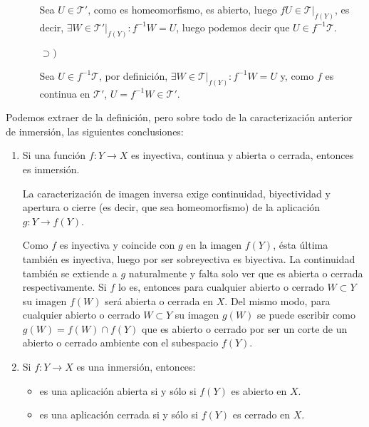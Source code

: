 \begin{demo}
\begin{itemize}
\begin{itemize}
        Sea $U \in \mathcal{T}'$, como es homeomorfismo, es abierto, luego $fU\in \mathcal{T}|_{f\left( Y \right)}$, es decir, $\exists W \in \mathcal{T}'|_{f\left( Y \right)}: f^{-1}W = U$, luego podemos decir que $U \in f^{-1}\mathcal{T}$. 
        \item[$\supset)$]
        
        Sea $U \in f^{-1}\mathcal{T}$, por definición, $\exists W \in \mathcal{T}|_{f\left( Y \right)}: f^{-1}W = U$ y, como $f$ es continua en $\mathcal{T}'$, $U = f^{-1} W \in \mathcal{T}'$.
    \end{itemize}
\end{itemize} 
\end{demo}

\begin{obs}
Podemos extraer de la definición, pero sobre todo de la caracterización anterior de inmersión, las siguientes conclusiones:
\begin{enumerate}
    \item Si una función $f: Y \rightarrow X$ es inyectiva, continua y abierta o cerrada, entonces es inmersión.
    \begin{demo}
    La caracterización de imagen inversa exige continuidad, biyectividad y apertura o cierre (es decir, que sea homeomorfismo) de la aplicación $g: Y \rightarrow f(Y)$. 

    Como $f$ es inyectiva y coincide con $g$ en la imagen $f(Y)$, ésta última también es inyectiva, luego por ser sobreyectiva es biyectiva. La continuidad también se extiende a $g$ naturalmente y falta solo ver que es abierta o cerrada respectivamente. Si $f$ lo es, entonces para cualquier abierto o cerrado $W\subset Y$ su imagen $f(W)$ será abierta o cerrada en $X$. Del mismo modo, para cualquier abierto o cerrado $W\subset Y$ su imagen $g(W)$ se puede escribir como $g(W) = f(W)\cap f(Y)$ que es abierto o cerrado por ser un corte de un abierto o cerrado ambiente con el subespacio $f(Y)$.
    \end{demo}

    \item Si $f: Y \rightarrow X$ es una inmersión, entonces:
	\begin{itemize}
		\item es una aplicación abierta si y sólo si 	$f(Y)$ es abierto en $X$.
		\item es una aplicación cerrada si y sólo si $f(Y)$ es cerrado en $X$.
	\end{itemize}	    
    

\end{enumerate}
\end{obs}
